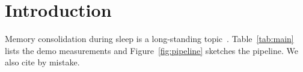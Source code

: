 \section{Introduction}
Memory consolidation during sleep is a long-standing topic~\cite{smith2018}.
Table~\ref{tab:main} lists the demo measurements and Figure~\ref{fig:pipeline}
sketches the pipeline. We also cite \cite{ghost2021} by mistake.
